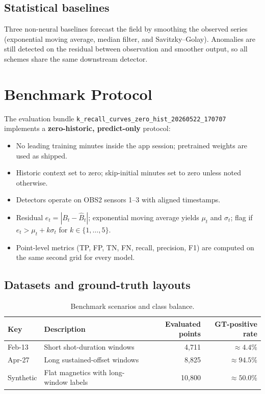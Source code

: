\subsection{Statistical baselines}
Three non-neural baselines forecast the field by smoothing the observed series (exponential moving average, median filter, and Savitzky--Golay). Anomalies are still detected on the residual between observation and smoother output, so all schemes share the same downstream detector.

\section{Benchmark Protocol}
The evaluation bundle \texttt{k\_recall\_curves\_zero\_hist\_20260522\_170707} implements a \textbf{zero-historic, predict-only} protocol:
\begin{itemize}
    \item No leading training minutes inside the app session; pretrained weights are used as shipped.
    \item Historic context set to zero; skip-initial minutes set to zero unless noted otherwise.
    \item Detectors operate on OBS2 sensors 1--3 with aligned timestamps.
    \item Residual $e_t = |B_t - \hat B_t|$; exponential moving average yields $\mu_t$ and $\sigma_t$; flag if $e_t > \mu_t + k\sigma_t$ for $k \in \{1,\ldots,5\}$.
    \item Point-level metrics (TP, FP, TN, FN, recall, precision, F1) are computed on the same second grid for every model.
\end{itemize}

\subsection{Datasets and ground-truth layouts}
\begin{table}[htbp]
\centering
\caption{Benchmark scenarios and class balance.}
\label{tab:benchmark_scenarios}
\begin{tabular}{|l|l|r|r|}
\hline
\textbf{Key} & \textbf{Description} & \textbf{Evaluated points} & \textbf{GT-positive rate} \\
\hline
Feb-13 & Short shot-duration windows & 4,711 & $\approx 4.4\%$ \\
Apr-27 & Long sustained-offset windows & 8,825 & $\approx 94.5\%$ \\
Synthetic & Flat magnetics with long-window labels & 10,800 & $\approx 50.0\%$ \\
\hline
\end{tabular}
\end{table}

